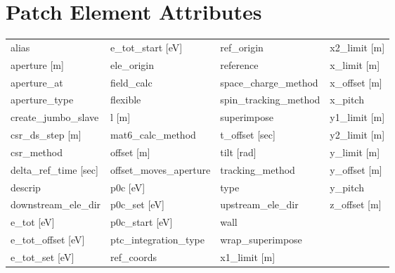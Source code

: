  \section{Patch Element Attributes}
 \label{s:list.patch}
 
 \begin{tabular}{llll} \toprule
alias                            & e_tot_start [eV]                 & ref_origin                       & x2_limit [m]                     \\
aperture [m]                     & ele_origin                       & reference                        & x_limit [m]                      \\
aperture_at                      & field_calc                       & space_charge_method              & x_offset [m]                     \\
aperture_type                    & flexible                         & spin_tracking_method             & x_pitch                          \\
create_jumbo_slave               & l [m]                            & superimpose                      & y1_limit [m]                     \\
csr_ds_step [m]                  & mat6_calc_method                 & t_offset [sec]                   & y2_limit [m]                     \\
csr_method                       & offset [m]                       & tilt [rad]                       & y_limit [m]                      \\
delta_ref_time [sec]             & offset_moves_aperture            & tracking_method                  & y_offset [m]                     \\
descrip                          & p0c [eV]                         & type                             & y_pitch                          \\
downstream_ele_dir               & p0c_set [eV]                     & upstream_ele_dir                 & z_offset [m]                     \\
e_tot [eV]                       & p0c_start [eV]                   & wall                             &                                  \\
e_tot_offset [eV]                & ptc_integration_type             & wrap_superimpose                 &                                  \\
e_tot_set [eV]                   & ref_coords                       & x1_limit [m]                     &                                  \\
 \bottomrule
 \end{tabular}
 \vfill
 
